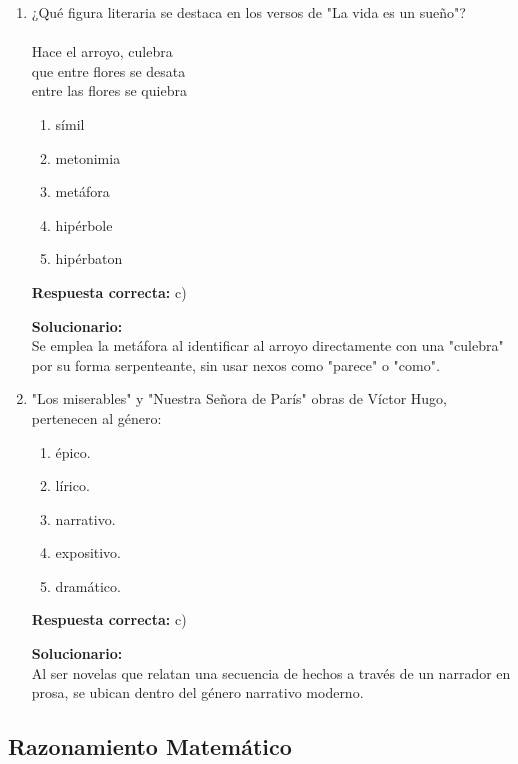 \begin{enumerate}
	\item ¿Qué figura literaria se destaca en los versos de "La vida es un sueño"?\\
	\\
	Hace el arroyo, culebra\\
	que entre flores se desata\\
	entre las flores se quiebra
	\begin{enumerate}[label=\alph*)]
		\item símil
		\item metonimia
		\item metáfora
		\item hipérbole
		\item hipérbaton
	\end{enumerate}
	\textbf{Respuesta correcta:} c)
	
	\vspace{2mm}
	\textbf{Solucionario:}\\
	Se emplea la metáfora al identificar al arroyo directamente con una "culebra" por su forma serpenteante, sin usar nexos como "parece" o "como".
	
	\vspace{6mm}
	
	\item "Los miserables" y "Nuestra Señora de París" obras de Víctor Hugo, pertenecen al género:
	\begin{enumerate}[label=\alph*)]
		\item épico.
		\item lírico.
		\item narrativo.
		\item expositivo.
		\item dramático.
	\end{enumerate}
	\textbf{Respuesta correcta:} c)
	
	\vspace{2mm}
	\textbf{Solucionario:}\\
	Al ser novelas que relatan una secuencia de hechos a través de un narrador en prosa, se ubican dentro del género narrativo moderno.
	
	\vspace{6mm}
\end{enumerate}











\subsection*{Razonamiento Matemático}

